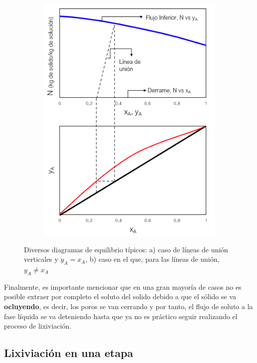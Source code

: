\documentclass[11pt]{book}
\begin{document}
\begin{figure}[H]
\begin{subfigure}[b]{0.45\textwidth}
    \includegraphics[width=\textwidth]{img/lixiviacion/EquilibrioLixiviacion_2.PNG}
    \caption{ }
    \label{Fig:Lixiviacion_3}
  \end{subfigure}
  \caption{Diversos diagramas de equilibrio típicos: a) caso de líneas de unión verticales y $y_A = x_A$, b) caso en el que, para las líneas de unión, $y_A \neq x_A$}
\end{figure}

Finalmente, es importante mencionar que en una gran mayoría de casos no es posible extraer por completo el soluto del solido debido a que el sólido se va \textbf{ocluyendo}, es decir, los poros se van cerrando y por tanto, el flujo de soluto a la fase líquida se va deteniendo hasta que ya no es práctico seguir realizando el proceso de lixiviación.

\subsection{Lixiviación en una etapa}
\end{document}
